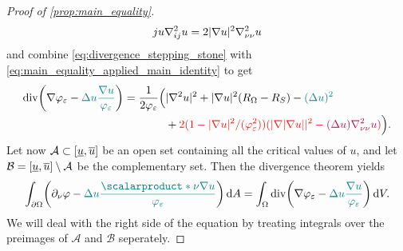 \documentclass[draft]{amsart}
\newcommand*{\mathfullstop}{.}
\DeclarePairedDelimiter{\parens}{(}{)}
\let\p\parens %
\newcommand*{\definedas}{\coloneqq}
\newcommand*{\laplacian}{\Delta}
\newcommand*{\boundary}{\partial}
\DeclareMathOperator{\divergence}{div}
\DeclarePairedDelimiter{\abs}{\lvert}{\rvert} %
\begin{document}
\begin{proof}[Proof of \cref{prop:main_equality}]
\begin{equation*}
{        j u \nabla^2_{ij}u=2\abs{\nabla u}^2 \nabla^2_{\nu \nu}u}
    \end{equation*} 
    and combine \cref{eq:divergence_stepping_stone} with \cref {eq:main_equality_applied_main_identity} to get
    \begin{equation}
        \divergence\p*{\nabla \varphi_{\varepsilon}-\nonHarmonic{\laplacian u \frac{\nabla u}{\varphi_{\varepsilon}}}}=\begin{aligned}[t]
            \frac{1}{2\varphi_{\varepsilon}}\Bigl(&\abs{\nabla^2 u}^2+\abs{\nabla u}^2(R_\Omega-R_S)-\nonHarmonic{(\laplacian u)^2}\\
            &+\additionalTerms{2 (1-\abs{\nabla u}^2/(\varphi_{\varepsilon}^2))(\abs{\nabla\abs{\nabla u}}^2-\additionalNonHarmonicTerms{(\laplacian u)\nabla^2_{\nu \nu}u})}\Bigr)\mathfullstop\label{eq:regular_level_set_divergence}
        \end{aligned}
    \end{equation}
    Let now \( \mathcal{A}\subset \interval{\minu}{\maxu} \) be an open set containing all the critical values of \( u \), and let \( \mathcal{B}=\interval{\minu}{\maxu}\setminus \mathcal{A} \) be the complementary set. Then the divergence theorem yields
    \begin{equation}
        \int_{\boundary{\Omega}}\p*{\partial_\nu \varphi-\nonHarmonic{\laplacian u \frac{\scalarproduct*{\nu}{\nabla u}}{\varphi_{\varepsilon}}}}\odif{A}=\int_{\Omega}\divergence\p*{\nabla \varphi_{\varepsilon}-\nonHarmonic{\laplacian u \frac{\nabla u}{\varphi_{\varepsilon}}}}\odif{V}\mathfullstop\label{eq:main_equality_branching_point}
    \end{equation}
    We will deal with the right side of the equation by treating integrals over the preimages of \( \mathcal{A} \) and \( \mathcal{B} \) seperately. 
    

\end{proof}
\end{document}
